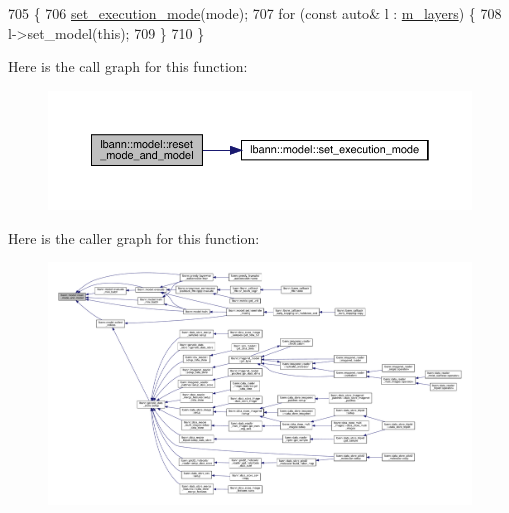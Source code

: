 \begin{DoxyCode}
705                                                     \{
706   \hyperlink{classlbann_1_1model_a375372b5b864ffbc4eaa0963f6939f65}{set\_execution\_mode}(mode);
707   \textcolor{keywordflow}{for} (\textcolor{keyword}{const} \textcolor{keyword}{auto}& l : \hyperlink{classlbann_1_1model_a0229fc226ec163d1411548446104569d}{m\_layers}) \{
708     l->set\_model(\textcolor{keyword}{this});
709   \}
710 \}
\end{DoxyCode}
Here is the call graph for this function\+:\nopagebreak
\begin{figure}[H]
\begin{center}
\leavevmode
\includegraphics[width=350pt]{classlbann_1_1model_a5d188d75f53e0a4c6161500181b27c03_cgraph}
\end{center}
\end{figure}
Here is the caller graph for this function\+:\nopagebreak
\begin{figure}[H]
\begin{center}
\leavevmode
\includegraphics[width=350pt]{classlbann_1_1model_a5d188d75f53e0a4c6161500181b27c03_icgraph}
\end{center}
\end{figure}
\mbox{\label{classlbann_1_1model_a3d589d2e46ad35d0a1221e25bef70fa4}} 
